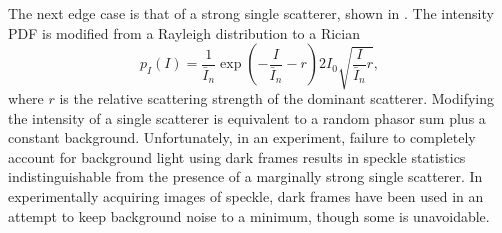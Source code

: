 The next edge case is that of a strong single scatterer, shown in 
.  The intensity PDF is modified
from a Rayleigh distribution to a Rician~\cite{goodman2007speckle} 
\begin{equation}
p_I(I) = \frac{1}{\bar{I}_n} \exp\left(-\frac{I}{\bar{I}_n} - r\right) 2 I_0
\sqrt{\frac{I}{\bar{I}_n} r},
\label{ricedpf}
\end{equation}
where $r$ is the relative scattering strength of the dominant scatterer.
Modifying the intensity of a single scatterer is equivalent to a random phasor
sum plus a constant background.  Unfortunately, in an experiment, failure to
completely account for background light using dark frames results in speckle
statistics indistinguishable from the presence of a marginally strong single
scatterer.  In experimentally acquiring images of speckle, dark frames have
been used in an attempt to keep background noise to a minimum, though some is
unavoidable.
